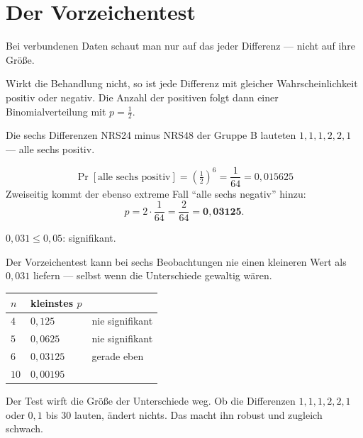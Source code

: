 \section{Der Vorzeichentest}

\begin{merksatz}
Bei verbundenen Daten schaut man nur auf das  jeder Differenz --- nicht auf ihre Größe.

Wirkt die Behandlung nicht, so ist jede Differenz mit gleicher Wahrscheinlichkeit positiv oder negativ. Die Anzahl der positiven folgt dann einer Binomialverteilung mit $p = \frac12$.

Die sechs Differenzen NRS24 minus NRS48 der Gruppe B lauteten $1, 1, 1, 2, 2, 1$ --- alle sechs positiv.

\[ \Pr[\text{alle sechs positiv}] = \left(\tfrac12\right)^6 = \frac{1}{64} = 0{,}015625 \]
Zweiseitig kommt der ebenso extreme Fall \enquote{alle sechs negativ} hinzu:
\[ p = 2 \cdot \frac{1}{64} = \frac{2}{64} = \mathbf{0{,}03125} . \]

$0{,}031 \le 0{,}05$: signifikant.
\end{merksatz}

\begin{warnung}
Der Vorzeichentest kann bei sechs Beobachtungen nie einen kleineren Wert als $0{,}031$ liefern --- selbst wenn die Unterschiede gewaltig wären.

\begin{center}
\renewcommand{\arraystretch}{1.45}
\begin{tabular}{@{}P{2.0cm}P{2.4cm}P{3.0cm}@{}}
\toprule
$n$ & \textbf{kleinstes $p$} & \\
\midrule
$4$ & $0{,}125$ & \textcolor{akzent}{nie signifikant}\\
$5$ & $0{,}0625$ & \textcolor{akzent}{nie signifikant}\\
$6$ & $0{,}03125$ & gerade eben\\
$10$ & $0{,}00195$ & \\
\bottomrule
\end{tabular}
\end{center}

\begin{center}
\begin{minipage}{0.88\textwidth}
\end{minipage}
\end{center}

Der Test wirft die Größe der Unterschiede weg. Ob die Differenzen $1, 1, 1, 2, 2, 1$ oder $0{,}1$ bis $30$ lauten, ändert nichts. Das macht ihn robust und zugleich schwach.
\end{warnung}

